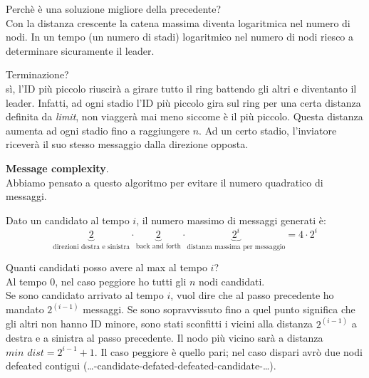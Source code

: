 
Perchè è una soluzione migliore della precedente? \\
Con la distanza crescente la catena massima diventa logaritmica nel numero di nodi.
In un tempo (un numero di stadi) logaritmico nel numero di nodi riesco a determinare sicuramente il leader.






Terminazione? \\
sì, l'ID più piccolo riuscirà a girare tutto il ring battendo gli altri e diventanto il leader.
Infatti, ad ogni stadio l'ID più piccolo gira sul ring per una certa distanza definita da \textit{limit}, non
viaggerà mai meno siccome è il più piccolo. Questa distanza aumenta ad ogni stadio fino a raggiungere $n$.
Ad un certo stadio, l'inviatore riceverà il suo stesso messaggio dalla direzione opposta.

\textbf{Message complexity}. \\
Abbiamo pensato a questo algoritmo per evitare il numero quadratico di messaggi.

Dato un candidato al tempo $i$, il numero massimo di messaggi generati è:
$$
\underbrace{2}_\text{direzioni destra e sinistra} \cdot
\underbrace{2}_\text{back and forth} \cdot
\underbrace{2^i}_\text{distanza massima per messaggio} = 4 \cdot 2^i
$$

Quanti candidati posso avere al max al tempo $i$?\\
Al tempo 0, nel caso peggiore ho tutti gli $n$ nodi candidati.\\
Se sono candidato arrivato al tempo $i$, vuol dire che al passo precedente ho mandato $2^{(i-1)}$ messaggi.
Se sono sopravvissuto fino a quel punto significa che gli altri non hanno ID minore, sono stati sconfitti i vicini alla distanza
$2^{(i-1)}$ a destra e a sinistra al passo precedente.
Il nodo più vicino sarà a distanza $\textit{min dist} = 2^{i-1}+1$.
Il caso peggiore è quello pari; nel caso dispari avrò due nodi defeated contigui (\dots-candidate-defated-defeated-candidate-\dots).

